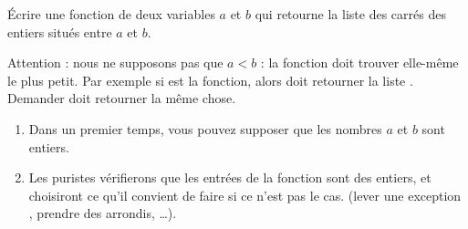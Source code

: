 
\begin{exercice}\label{exoPremiere-0027}

    Écrire une fonction de deux variables \( a\) et \( b\) qui retourne la liste des carrés des entiers situés entre \( a\) et \( b\).

    Attention : nous ne supposons pas que \( a<b\) : la fonction doit trouver elle-même le plus petit. Par exemple si  est la fonction, alors  doit retourner la liste \info{[16,25,36,49,64]}. Demander  doit retourner la même chose.

    \begin{enumerate}
        \item
            Dans un premier temps, vous pouvez supposer que les nombres \( a\) et \( b\) sont entiers.
        \item
            Les puristes vérifierons que les entrées de la fonction sont des entiers, et choisiront ce qu'il convient de faire si ce n'est pas le cas. (lever une exception , prendre des arrondis, \ldots).
    \end{enumerate}

\end{exercice}
